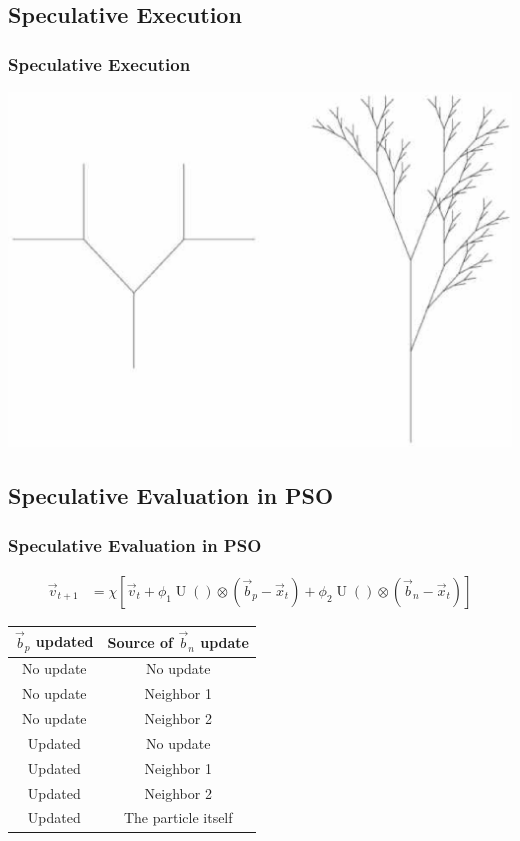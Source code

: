 \documentclass{beamer}
\DeclareMathOperator{\URand}{U}
\providecommand{\ppos}{\ensuremath{\Vec{x}}}
\providecommand{\pvel}{\ensuremath{\Vec{v}}}
\providecommand{\nbest}{\ensuremath{\Vec{b}_n}}
\providecommand{\pbest}{\ensuremath{\Vec{b}_p}}
\providecommand{\constriction}{\ensuremath{\chi}}
\providecommand{\coeff}{\ensuremath{\phi}}
\begin{document}
\subsection{Speculative Execution}
\begin{frame}
  \frametitle{Speculative Execution}
  \includegraphics[width=\textwidth]{branching.eps}
\end{frame}

\subsection{Speculative Evaluation in PSO}
\begin{frame}
  \frametitle{Speculative Evaluation in PSO}
  \begin{align*}
	  \pvel_{t+1} &=
		  \constriction \left[ \pvel_t +
			  \coeff_1\URand()\otimes(\pbest - \ppos_t) +
			  \coeff_2\URand()\otimes(\nbest - \ppos_t)
		  \right]
  \end{align*}
  \pause
  \begin{center}
	\begin{tabular}{cc}
	  $\pbest$ updated&Source of $\nbest$ update\\
	  \hline
	  \hline
	  No update&No update\\
	  \hline
	  No update&Neighbor 1\\
	  \hline
	  No update&Neighbor 2\\
	  \hline
	  Updated&No update\\
	  \hline
	  Updated&Neighbor 1\\
	  \hline
	  Updated&Neighbor 2\\
	  \hline
	  Updated&The particle itself\\
	  \hline
	\end{tabular}
  \end{center}
\end{frame}
\end{document}
